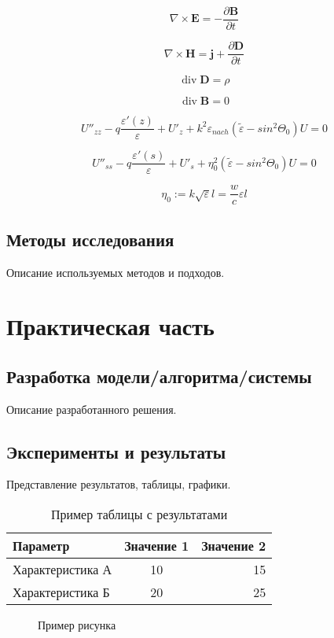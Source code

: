 \documentclass[a4paper,14pt]{extreport} %
\begin{document}
$$
\nabla \times \mathbf{E} = - \frac{\partial \mathbf{B}}{\partial t}
$$

$$
\nabla \times \mathbf{H} = \mathbf{j} +\frac{\partial \mathbf{D}}{\partial t}
$$

$$
\operatorname{div} \mathbf{D} = \rho
$$

$$
\operatorname{div} \mathbf{B} = 0
$$

$$
U''_{zz} - q\frac{\varepsilon'(z)}{\varepsilon} + U'_{z}+k^2\varepsilon_{nach}(\tilde{\varepsilon}-sin^2\Theta_0)U=0
$$

$$
U''_{ss} - q\frac{\varepsilon'(s)}{\varepsilon} + U'_{s}+\eta_0^2(\tilde{\varepsilon}-sin^2\Theta_0)U=0
$$

$$
\eta_0:=k\sqrt{\varepsilon}l=\frac{w}{c}{\varepsilon}l
$$


\section{Методы исследования}
Описание используемых методов и подходов.

\chapter{Практическая часть}
\section{Разработка модели/алгоритма/системы}
Описание разработанного решения.

\section{Эксперименты и результаты}
Представление результатов, таблицы, графики.

\begin{table}[h]
\centering
\caption{Пример таблицы с результатами}
\begin{tabular}{|l|c|r|}
\hline
Параметр & Значение 1 & Значение 2 \\
\hline
Характеристика А & 10 & 15 \\
Характеристика Б & 20 & 25 \\
\hline
\end{tabular}
\end{table}

\begin{figure}[h]
    \centering
    \caption{Пример рисунка}
    \label{fig:example}
\end{figure}
\end{document}
